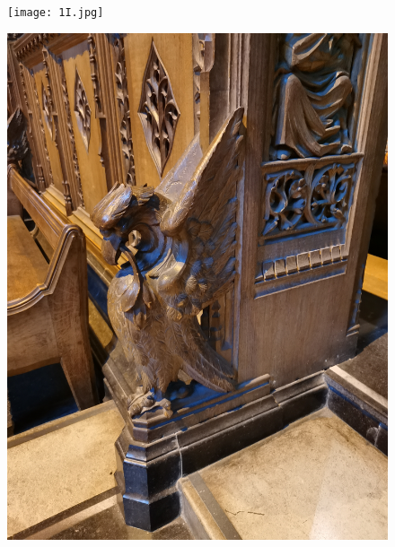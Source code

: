 \documentclass[11pt]{article}
\begin{document}
\begin{figure}[H]
    \centering
    \texttt{[image: 1I.jpg]}
\end{figure}

\begin{figure}[H]
    \centering
    \includegraphics[width=\textwidth]{1J.jpg}
\end{figure}
\end{document}
